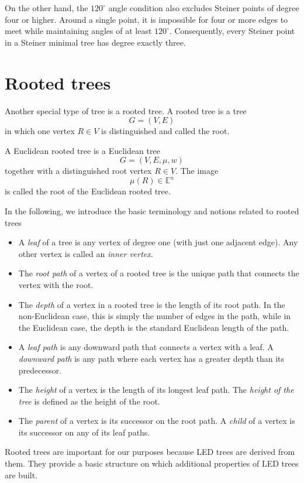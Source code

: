 \documentclass[openany]{book}
\begin{document}
	On the other hand, the \(120^\circ\) angle condition also excludes Steiner points of degree four or higher. Around a single point, it is impossible for four or more edges to meet while maintaining angles of at least \(120^\circ\). Consequently, every Steiner point in a Steiner minimal tree has degree exactly three.
	
	\section{Rooted trees}

	Another special type of tree is a rooted tree. A rooted tree is a tree
	\[
	G = (V,E)
	\]
	in which one vertex \( R \in V \) is distinguished and called the root.
	
	A Euclidean rooted tree is a Euclidean tree
	\[
	G = (V,E,\mu,w)
	\]
	together with a distinguished root vertex \( R \in V \). The image
	\[
	\mu(R) \in \mathbb{E}^n
	\]
	is called the root of the Euclidean rooted tree.
	
	In the following, we introduce the basic terminology and notions related to rooted trees
	\begin{itemize}
		\item A \emph{leaf} of a tree is any vertex of degree one (with just one adjacent edge). Any other vertex is called an \emph{inner vertex}.
		\item The \emph{root path} of a vertex of a rooted tree is the unique path that connects the vertex with the root.
		\item The \emph{depth} of a vertex in a rooted tree is the length of its root path. In the non-Euclidean case, this is simply the number of edges in the path, while in the Euclidean case, the depth is the standard Euclidean length of the path.
		\item A \emph{leaf path} is any downward path that connects a vertex with a leaf. A \emph{downward path} is any path where each vertex has a greater depth than its predecessor.
		\item The \emph{height} of a vertex is the length of its longest leaf path. The \emph{height of the tree} is defined as the height of the root.
		\item The \emph{parent} of a vertex is its successor on the root path. A \emph{child} of a vertex is its successor on any of its leaf paths.
	\end{itemize}
	
	Rooted trees are important for our purposes because LED trees are derived from them. They provide a basic structure on which additional properties of LED trees are built.
	
\end{document}
